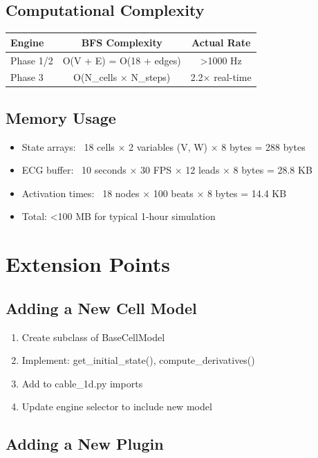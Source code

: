 \documentclass[11pt, a4paper]{article}
\begin{document}
\subsection{Computational Complexity}

\begin{tabularx}{\textwidth}{|l|c|c|}
\hline
\textbf{Engine} & \textbf{BFS Complexity} & \textbf{Actual Rate} \\
\hline
Phase 1/2 & O(V + E) = O(18 + edges) & >1000 Hz \\
Phase 3 & O(N_cells × N\_steps) & 2.2× real-time \\
\hline
\end{tabularx}

\subsection{Memory Usage}

\begin{itemize}
    \item State arrays: ~18 cells × 2 variables (V, W) × 8 bytes = 288 bytes
    \item ECG buffer: ~10 seconds × 30 FPS × 12 leads × 8 bytes = 28.8 KB
    \item Activation times: ~18 nodes × 100 beats × 8 bytes = 14.4 KB
    \item Total: <100 MB for typical 1-hour simulation
\end{itemize}

\section{Extension Points}

\subsection{Adding a New Cell Model}

\begin{enumerate}
    \item Create subclass of BaseCellModel
    \item Implement: get\_initial\_state(), compute\_derivatives()
    \item Add to cable\_1d.py imports
    \item Update engine selector to include new model
\end{enumerate}

\subsection{Adding a New Plugin}
\end{document}
